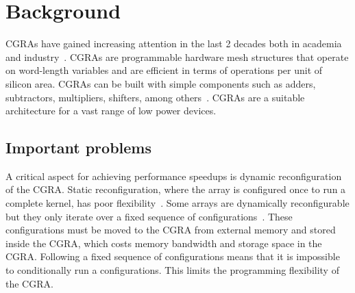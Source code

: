
\chapter{Background}
\label{chapter:background}

CGRAs have gained increasing attention in the last 2 decades both in
academia and industry~\cite{Mei05,Lee00,Weinhardt03,Quax04,deSousa12}.
CGRAs are programmable hardware mesh structures that operate on
word-length variables and are efficient in terms of operations per unit
of silicon area. CGRAs can be built with simple components such as adders, subtractors, multipliers, shifters, among others~\cite{Tripp07,deSousa12}.
CGRAs are a suitable architecture for a vast range of low power devices.



\section{Important problems}
\label{section:problems}

A critical aspect for achieving performance speedups is dynamic
reconfiguration of the CGRA. Static reconfiguration, where the array
is configured once to run a complete kernel, has poor
flexibility~\cite{Hartenstein01}. Some arrays are dynamically
reconfigurable but they only iterate over a fixed sequence of
configurations~\cite{Quax04,Mei05,Lee00}. These configurations must be
moved to the CGRA from external memory and stored inside the CGRA,
which costs memory bandwidth and storage space in the CGRA. Following
a fixed sequence of configurations means that it is impossible to
conditionally run a configurations. This limits the programming
flexibility of the CGRA.

